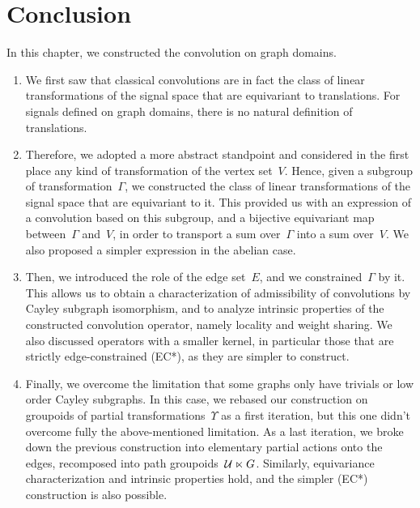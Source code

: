 \section{Conclusion}

In this chapter, we constructed the convolution on graph domains.

\begin{enumerate}
\item We first saw that classical convolutions are in fact the class of linear transformations of the signal space that are equivariant to translations. For signals defined on graph domains, there is no natural definition of translations.
\item Therefore, we adopted a more abstract standpoint and considered in the first place any kind of transformation of the vertex set~$V$. Hence, given a subgroup of transformation~$\Gamma$, we constructed the class of linear transformations of the signal space that are equivariant to it. This provided us with an expression of a convolution based on this subgroup, and a bijective equivariant map between~$\Gamma$ and~$V$, in order to transport a sum over~$\Gamma$ into a sum over~$V$. We also proposed a simpler expression in the abelian case.
\item Then, we introduced the role of the edge set~$E$, and we constrained~$\Gamma$ by it. This allows us to obtain a characterization of admissibility of convolutions by Cayley subgraph isomorphism, and to analyze intrinsic properties of the constructed convolution operator, namely locality and weight sharing. We also discussed operators with a smaller kernel, in particular those that are strictly edge-constrained (EC*), as they are simpler to construct.
\item Finally, we overcome the limitation that some graphs only have trivials or low order Cayley subgraphs. In this case, we rebased our construction on groupoids of partial transformations~$\Upsilon$ as a first iteration, but this one didn't overcome fully the above-mentioned limitation. As a last iteration, we broke down the previous construction into elementary partial actions onto the edges, recomposed into path groupoids~$\mathcal{U} \ltimes G$. Similarly, equivariance characterization and intrinsic properties hold, and the simpler (EC*) construction is also possible.
\end{enumerate}


